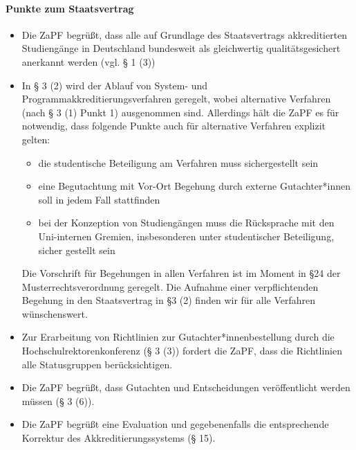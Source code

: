 \documentclass[DIV=calc]{scrartcl}
\begin{document}
\paragraph{Punkte zum Staatsvertrag}
\begin{itemize}

\item Die ZaPF begrüßt, dass alle auf Grundlage des Staatsvertrags akkreditierten Studiengänge in Deutschland bundesweit als gleichwertig qualitätsgesichert anerkannt werden (vgl. § 1 (3))

\item In § 3 (2) wird der Ablauf von System- und Programmakkreditierungsverfahren geregelt, wobei alternative Verfahren (nach § 3 (1) Punkt 1) ausgenommen sind. Allerdings hält die ZaPF es für notwendig, dass folgende Punkte auch für alternative Verfahren explizit gelten: %
\begin{itemize}
    \item die studentische Beteiligung am Verfahren muss sichergestellt sein
    \item eine Begutachtung mit Vor-Ort Begehung durch externe Gutachter*innen soll in jedem Fall stattfinden
    \item bei der Konzeption von Studiengängen muss die Rücksprache mit den Uni-internen Gremien, insbesonderen unter studentischer Beteiligung, sicher gestellt sein
 \end{itemize}   
    Die Vorschrift für Begehungen in allen Verfahren ist im Moment in §24 der Musterrechtsverordnung geregelt. Die Aufnahme einer verpflichtenden Begehung in den Staatsvertrag in §3 (2) finden wir für alle Verfahren wünschenswert.
\item Zur Erarbeitung von Richtlinien zur Gutachter*innenbestellung durch die Hochschulrektorenkonferenz (§ 3 (3)) fordert die ZaPF, dass die Richtlinien alle Statusgruppen berücksichtigen.

\item Die ZaPF begrüßt, dass Gutachten und Entscheidungen veröffentlicht werden müssen (§ 3 (6)).

\item Die ZaPF begrüßt eine Evaluation und gegebenenfalls die entsprechende Korrektur des Akkreditierungssystems (§ 15).
\end{itemize}
\end{document}
